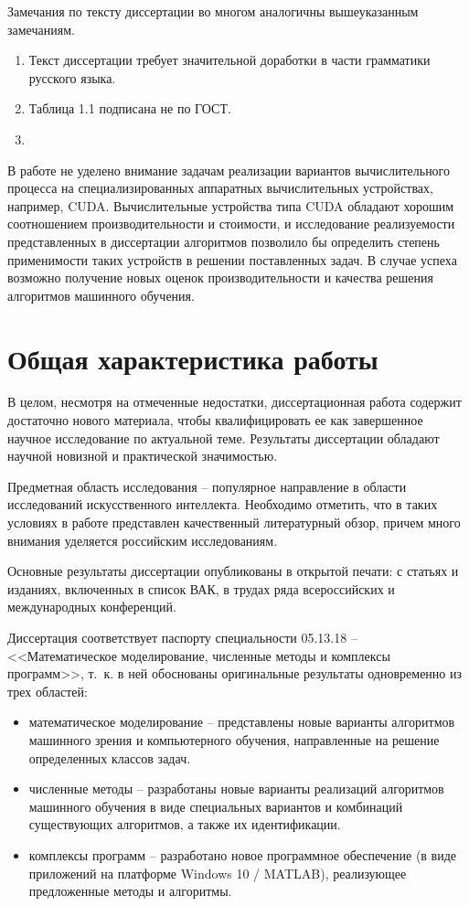 \documentclass[12pt]{extarticle}
\begin{document}
Замечания по тексту диссертации во многом аналогичны вышеуказанным замечаниям.
\begin{enumerate}
\item Текст диссертации требует значительной доработки в части грамматики русского языка.
\item Таблица 1.1 подписана не по ГОСТ.
\item
\end{enumerate}

В работе не уделено внимание задачам реализации вариантов вычислительного процесса на специализированных аппаратных вычислительных устройствах, например, CUDA.  Вычислительные устройства типа CUDA обладают хорошим соотношением производительности и стоимости, и исследование реализуемости представленных в диссертации алгоритмов позволило бы определить степень применимости таких устройств в решении поставленных задач.  В случае успеха возможно получение новых оценок производительности и качества решения алгоритмов машинного обучения.

\section{Общая характеристика работы}

В целом, несмотря на отмеченные недостатки, диссертационная работа содержит достаточно нового материала, чтобы квалифицировать ее как завершенное научное исследование по актуальной теме.  Результаты диссертации обладают научной новизной и практической значимостью.


Предметная область исследования -- популярное направление в области исследований искусственного интеллекта. Необходимо отметить, что в таких условиях в работе представлен качественный литературный обзор, причем много внимания уделяется российским исследованиям.

Основные результаты диссертации опубликованы в открытой печати: с статьях и изданиях, включенных в список ВАК, в трудах ряда всероссийских и международных конференций. %

Диссертация соответствует паспорту специальности 05.13.18 -- <<Математическое моделирование, численные методы и комплексы программ>>, т.~к. в ней обоснованы оригинальные результаты одновременно из трех областей:
\begin{itemize}
\item математическое моделирование -- представлены новые варианты алгоритмов машинного зрения и компьютерного обучения, направленные на решение определенных классов задач.

\item численные методы -- разработаны новые варианты реализаций алгоритмов машинного обучения в виде специальных вариантов и комбинаций существующих алгоритмов, а также их идентификации.

\item комплексы программ -- разработано новое программное обеспечение (в виде приложений на платформе Windows 10 / MATLAB), реализующее предложенные методы и алгоритмы.
\end{itemize}
\end{document}
